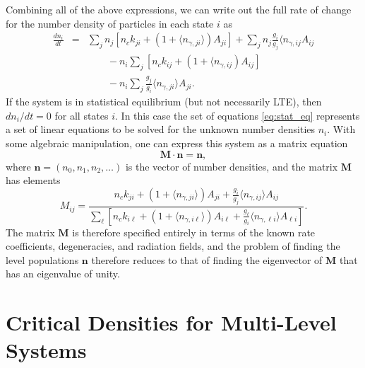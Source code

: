 Combining all of the above expressions, we can write out the full rate of change for the number density of particles in each state $i$ as
\begin{eqnarray}
\frac{dn_i}{dt} & = & \sum_j n_j\left[n_c k_{ji} + \left(1+\langle n_{\gamma,ji}\rangle\right) A_{ji}\right] +
 \sum_j n_j \frac{g_i}{g_j} \langle n_{\gamma,ij} A_{ij}
\nonumber \\
& & \qquad {} - n_i \sum_j \left[n_c k_{ij} + \left(1+\langle n_{\gamma,ij}\right) A_{ij}\right] 
\nonumber \\
& & \qquad {} -
 n_i \sum_j \frac{g_j}{g_i} \langle n_{\gamma,ji}\rangle A_{ji}.
\label{eq:stat_eq}
\end{eqnarray}
If the system is in statistical equilibrium (but not necessarily LTE), then $dn_i/dt = 0$ for all states $i$. In this case the set of equations \ref{eq:stat_eq} represents a set of linear equations to be solved for the unknown number densities $n_i$. With some algebraic manipulation, one can express this system as a matrix equation
\begin{equation}
\mathbf{M} \cdot \mathbf{n} = \mathbf{n},
\end{equation}
where $\mathbf{n} = (n_0, n_1, n_2, \ldots)$ is the vector of number densities, and the matrix $\mathbf{M}$ has elements
\begin{equation}
M_{ij} = \frac{n_c k_{ji} + \left(1 + \langle n_{\gamma,ji}\rangle\right) A_{ji} + \frac{g_i}{g_j} \langle n_{\gamma,ij}\rangle A_{ij}}
{ \sum_\ell \left[n_c k_{i\ell} + \left(1 + \langle n_{\gamma,i\ell}\rangle\right) A_{i\ell} + \frac{g_\ell}{g_i} \langle n_{\gamma,\ell i}\rangle A_{\ell i}\right] }.
\end{equation}
The matrix $\mathbf{M}$ is therefore specified entirely in terms of the known rate coefficients, degeneracies, and radiation fields, and the problem of finding the level populations $\mathbf{n}$ therefore reduces to that of finding the eigenvector of $\mathbf{M}$ that has an eigenvalue of unity.

\section{Critical Densities for Multi-Level Systems}

